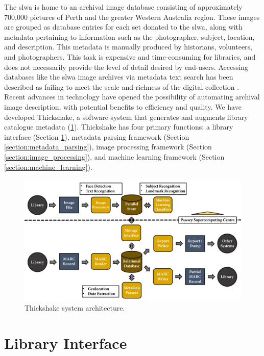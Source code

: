 \documentclass[10pt, a4paper]{article}
\begin{document}
The \Gls{slwa} is home to an archival image database consisting of approximately 700,000 pictures of Perth and the greater Western Australia region. These images are grouped as database entries for each set donated to the \Gls{slwa}, along with metadata pertaining to information such as the photographer, subject, location, and description. This metadata is manually produced by historians, volunteers, and photographers. This task is expensive and time-consuming for libraries, and does not necessarily provide the level of detail desired by end-users. Accessing databases like the \Gls{slwa} image archives via metadata text search has been described as failing to meet the scale and richness of the digital collection \cite{whitelaw2015}. Recent advances in technology have opened the possibility of automating archival image description, with potential benefits to efficiency and quality. We have developed Thickshake, a software system that generates and augments library catalogue metadata (\ref{figure:architecture}). Thickshake has four primary functions: a library interface (Section \ref{section:library_interface}), metadata parsing framework (Section \ref{section:metadata_parsing}), image processing framework (Section \ref{section:image_processing}), and machine learning framework (Section \ref{section:machine_learning}). 

\begin{figure}[ht]
  \centering
  \includegraphics[width=\columnwidth]{figures/architecture}
  \caption{Thickshake system architecture.}
  \label{figure:architecture}
\end{figure}

\section{Library Interface}
\label{section:library_interface}
\end{document}
